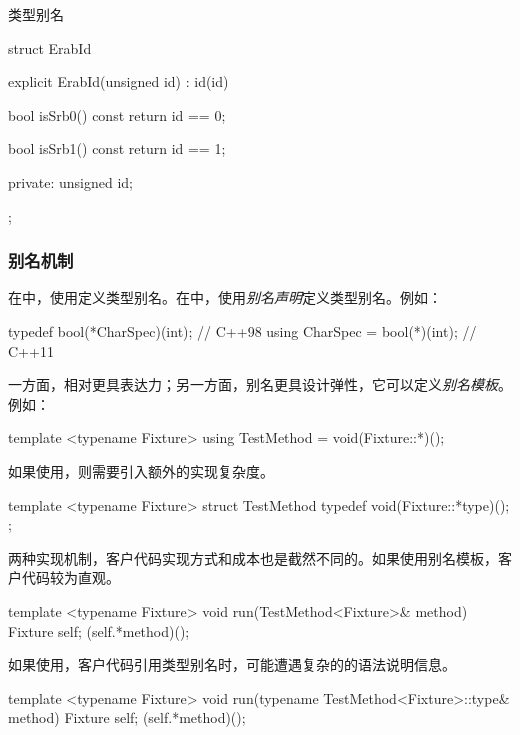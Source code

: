 \begin{content}
\begin{episode}{类型别名}
\begin{content}
\begin{c++}[title={\ttfamily{设计升级：使用类替代别名机制}}]
struct ErabId {
  explicit ErabId(unsigned id) : id(id) {
  }

  bool isSrb0() const {
    return id == 0;
  }

  bool isSrb1() const {
    return id == 1;
  }

private:
  unsigned id;
};
\end{c++}

\subsubsection{别名机制}

在中，使用定义类型别名。在中，使用\emph{别名声明}定义类型别名。例如：

\begin{c++}[title={\ttfamily{别名机制：函数指针}}]
typedef bool(*CharSpec)(int);     // C++98
using CharSpec = bool(*)(int);    // C++11
\end{c++}

一方面，相对更具表达力；另一方面，别名更具设计弹性，它可以定义\emph{别名模板}。例如：

\begin{c++}[title={\ttfamily{使用using：定义别名模板}}]
template <typename Fixture>
using TestMethod = void(Fixture::*)();
\end{c++}

如果使用，则需要引入额外的实现复杂度。

\begin{c++}[title={\ttfamily{使用typedef：定义别名模板}}]
template <typename Fixture>
struct TestMethod {
  typedef void(Fixture::*type)();
};
\end{c++}

两种实现机制，客户代码实现方式和成本也是截然不同的。如果使用别名模板，客户代码较为直观。

\begin{c++}[title={\ttfamily{使用using：定义别名模板}}]
template <typename Fixture>
void run(TestMethod<Fixture>& method) {
  Fixture self;
  (self.*method)();
}
\end{c++}

如果使用，客户代码引用类型别名时，可能遭遇复杂的的语法说明信息。

\begin{c++}[title={\ttfamily{使用using：定义别名模板}}]
template <typename Fixture>
void run(typename TestMethod<Fixture>::type& method) {
  Fixture self;
  (self.*method)();
}
\end{c++}


\end{content}
\end{episode}
\end{content}
